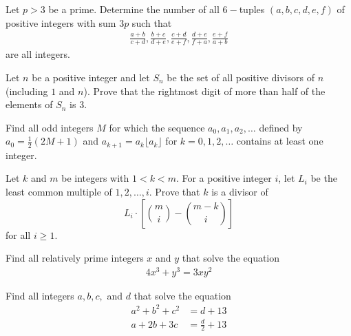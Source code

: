 \documentclass[problems.tex]{subfile}
\begin{document}
	\begin{problem}
		Let $p>3$ be a prime. Determine the number of all $6-$tuples $(a,b,c,d,e,f)$ of positive integers with sum $3p$ such that
			\begin{align*}
				\frac{a+b}{c+d}, \frac{b+c}{d+e}, \frac{c+d}{e+f}, \frac{d+e}{f+a}, \frac{e+f}{a+b}
			\end{align*}
		are all integers.
	\end{problem}

	\begin{problem}
		Let $n$ be a positive integer and let $S_n$ be the set of all positive divisors of $n$ (including $1$ and $n$). Prove that the rightmost digit of more than half of the elements of $S_n$ is $3$.
	\end{problem}

	\begin{problem}
		Find all odd integers $M$ for which the sequence $a_0,a_1,a_2,\dots$ defined by $a_0=\frac{1}{2}(2M+1)$ and $a_{k+1} = a_k \lfloor a_k \rfloor$ for $k=0,1,2,\dots$ contains at least one integer.
	\end{problem}

	\begin{problem}
		Let $k$ and $m$ be integers with $1 < k < m$. For a positive integer $i$, let $L_i$ be the least common multiple of $1,2,\ldots,i$.
		Prove that $k$ is a divisor of $$L_i \cdot \left[\binom{m}{i} - \binom{m-k}{i}\right]$$ for all $i \geq 1$. %
	\end{problem}

	\begin{problem}
		Find all relatively prime integers $x$ and $y$ that solve the equation
		\begin{align*}
			4x^3 + y^3 = 3xy^2
		\end{align*}
	\end{problem}

	\begin{problem}
		Find all integers $a,b,c,$ and $d$ that solve the equation
		\begin{align*}
			a^2 + b^2 + c^2 &= d + 13\\
			a + 2b + 3c &= \frac{d}{2}+ 13
		\end{align*}
	\end{problem}
\end{document}
